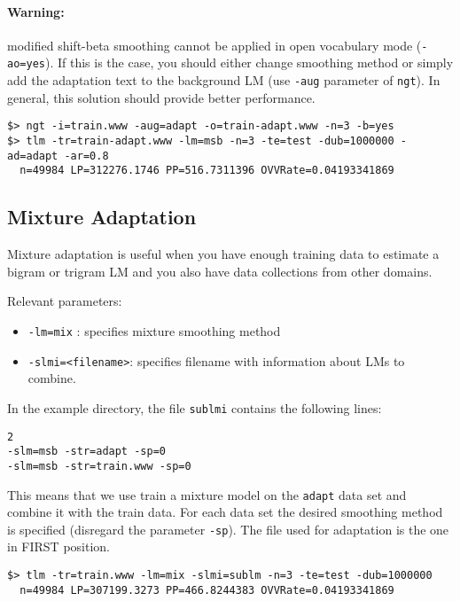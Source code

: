 \documentclass[11pt]{article}
\begin{document}
\noindent
\paragraph{Warning:}  modified shift-beta  smoothing  cannot  be applied  in  open
vocabulary mode  ({\tt -ao=yes}).  If  this is the  case, you  should either
change  smoothing method  or simply  add  the adaptation  text to  the
background LM (use {\tt -aug} parameter  of {\tt ngt}). In
general, this solution should  provide better performance.
\begin{small}
\begin{verbatim}
$> ngt -i=train.www -aug=adapt -o=train-adapt.www -n=3 -b=yes
$> tlm -tr=train-adapt.www -lm=msb -n=3 -te=test -dub=1000000 -ad=adapt -ar=0.8
  n=49984 LP=312276.1746 PP=516.7311396 OVVRate=0.04193341869
\end{verbatim}
\end{small}

\subsection{Mixture Adaptation}

\noindent
Mixture adaptation  is useful  when you have  enough training  data to
estimate a  bigram or  trigram LM and  you also have  data collections
from other domains.

\noindent
Relevant parameters:
\begin{itemize}
\item {\tt-lm=mix} : specifies mixture smoothing method
\item {\tt -slmi=<filename>}: specifies filename with information about LMs to combine.
\end{itemize}

\noindent
In the example directory, the file {\tt sublmi} contains the following lines:
\begin{verbatim}
2
-slm=msb -str=adapt -sp=0
-slm=msb -str=train.www -sp=0
\end{verbatim}

\noindent
This means  that we use train a  mixture model on the  {\tt adapt} data set and
combine it  with the train data. For each data  set the desired
smoothing method is specified  (disregard the parameter {\tt -sp}). The file
used for adaptation is the one in FIRST position.

\begin{verbatim}
$> tlm -tr=train.www -lm=mix -slmi=sublm -n=3 -te=test -dub=1000000
  n=49984 LP=307199.3273 PP=466.8244383 OVVRate=0.04193341869
\end{verbatim}
\end{document}
